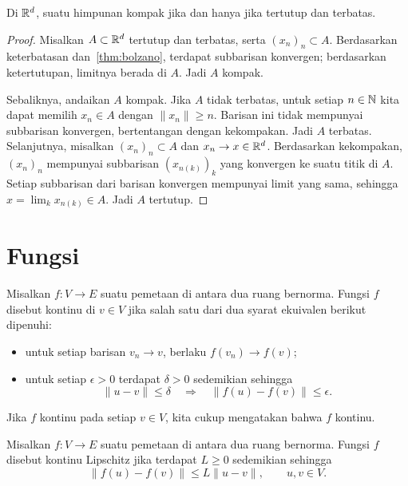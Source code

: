 \begin{cor}
    Di $\mathbb{R}^d$, suatu himpunan kompak jika dan hanya jika tertutup dan terbatas.
\end{cor}

\begin{proof}
    Misalkan $A\subset\mathbb{R}^d$ tertutup dan terbatas, serta
    $(x_n)_n\subset A$. Berdasarkan keterbatasan dan~\cref{thm:bolzano},
    terdapat subbarisan konvergen; berdasarkan ketertutupan, limitnya berada di
    $A$. Jadi $A$ kompak.

    Sebaliknya, andaikan $A$ kompak. Jika $A$ tidak terbatas, untuk setiap
    $n\in\mathbb{N}$ kita dapat memilih $x_n\in A$ dengan $\|x_n\|\geq n$. Barisan ini
    tidak mempunyai subbarisan konvergen, bertentangan dengan kekompakan. Jadi
    $A$ terbatas. Selanjutnya, misalkan $(x_n)_n\subset A$ dan
    $x_n\rightarrow x\in\mathbb{R}^d$. Berdasarkan kekompakan, $(x_n)_n$ mempunyai
    subbarisan $(x_{n(k)})_k$ yang konvergen ke suatu titik di $A$. Setiap
    subbarisan dari barisan konvergen mempunyai limit yang sama, sehingga
    $x=\lim_kx_{n(k)}\in A$. Jadi $A$ tertutup.
\end{proof}

\section{Fungsi}

\begin{defn}[Kontinuitas]
    Misalkan $f:V\rightarrow E$ suatu pemetaan di antara dua ruang bernorma.
    Fungsi $f$ disebut kontinu di $v\in V$ jika salah satu dari dua syarat
    ekuivalen berikut dipenuhi:
    \begin{itemize}
        \item untuk setiap barisan $v_n\rightarrow v$, berlaku
        $f(v_n)\rightarrow f(v)$;
        \item untuk setiap $\epsilon>0$ terdapat $\delta>0$ sedemikian sehingga
        \begin{equation}
            \|u-v\|\leq\delta
            \quad\Longrightarrow\quad
            \|f(u)-f(v)\|\leq\epsilon.
        \end{equation}
    \end{itemize}
    Jika $f$ kontinu pada setiap $v\in V$, kita cukup mengatakan bahwa $f$
    kontinu.
\end{defn}

\begin{defn}
    Misalkan $f:V\rightarrow E$ suatu pemetaan di antara dua ruang bernorma.
    Fungsi $f$ disebut kontinu Lipschitz jika terdapat $L\geq0$ sedemikian
    sehingga
    \begin{equation}
        \|f(u)-f(v)\|\leq L\|u-v\|,
        \qquad u,v\in V.
    \end{equation}
\end{defn}

